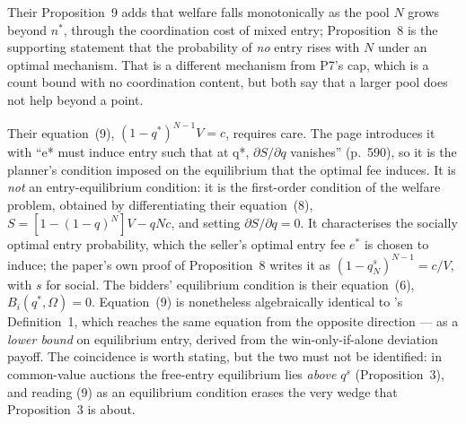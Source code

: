 \documentclass[11pt,a4paper]{article}
\begin{document}
Their Proposition~9 adds that welfare falls monotonically as the pool $N$ grows
beyond $n^*$, through the coordination cost of mixed entry; Proposition~8 is
the supporting statement that the probability of \emph{no} entry rises with $N$
under an optimal mechanism. That is a different mechanism from P7's cap, which
is a count bound with no coordination content, but both say that a larger pool
does not help beyond a point.

Their equation~(9), $(1-q^*)^{N-1} V = c$, requires care. The page introduces
it with ``e* must induce entry such that at q*, $\partial S/\partial q$
vanishes'' (p.~590), so it is the planner's condition imposed on the
equilibrium that the optimal fee induces. It is \emph{not} an
entry-equilibrium condition: it is the first-order condition of the welfare
problem, obtained by differentiating their equation~(8),
$S = [1-(1-q)^N]V - qNc$, and setting $\partial S/\partial q = 0$. It
characterises the socially optimal entry probability, which the seller's
optimal entry fee $e^*$ is chosen to induce; the paper's own proof of
Proposition~8 writes it as $(1-q^s_N)^{N-1} = c/V$, with $s$ for social. The
bidders' equilibrium condition is their equation~(6), $B_i(q^*,\Omega)=0$.
Equation~(9) is nonetheless algebraically identical to \citet{FuJiaoLu2015}'s
Definition~1, which reaches the same equation from the opposite direction --- as
a \emph{lower bound} on equilibrium entry, derived from the win-only-if-alone
deviation payoff. The coincidence is worth stating, but the two must not be
identified: in common-value auctions the free-entry equilibrium lies
\emph{above} $q^s$ (Proposition~3), and reading (9) as an equilibrium condition
erases the very wedge that Proposition~3 is about.
\end{document}
